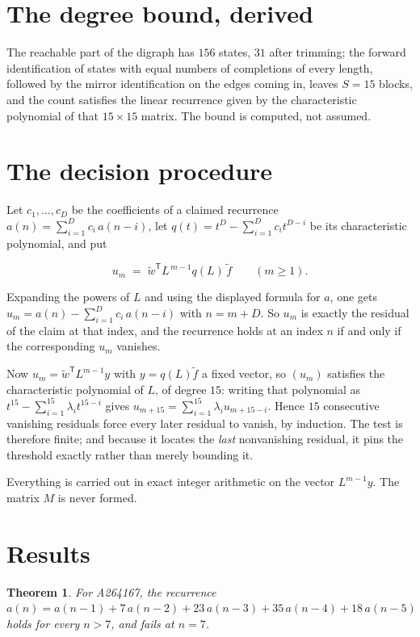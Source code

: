 \documentclass[11pt]{article}
\newtheorem{theorem}{Theorem}
\theoremstyle{definition}
\begin{document}
\section{The degree bound, derived}

The reachable part of the digraph has $156$ states, $31$ after trimming; the forward identification of states with equal numbers of completions of every length, followed by the mirror identification on the edges coming in, leaves $S = 15$ blocks, and the count satisfies the linear recurrence given by the characteristic polynomial of that $15\times15$ matrix. The bound is computed, not assumed.

\section{The decision procedure}

Let $c_1,\dots,c_D$ be the coefficients of a claimed recurrence $a(n) = \sum_{i=1}^{D} c_i\,a(n-i)$, let $q(t) = t^{D} - \sum_{i=1}^{D} c_i t^{D-i}$ be its characteristic polynomial, and put

\[u_m \;=\; \tilde w^{\mathsf T} L^{\,m-1} q(L)\,\tilde f \qquad (m \ge 1).\]

Expanding the powers of $L$ and using the displayed formula for $a$, one gets $u_m = a(n) - \sum_{i=1}^{D} c_i\,a(n-i)$ with $n = m + D$. So $u_m$ is exactly the residual of the claim at that index, and the recurrence holds at an index $n$ if and only if the corresponding $u_m$ vanishes.

Now $u_m = \tilde w^{\mathsf T} L^{m-1} y$ with $y = q(L)\tilde f$ a fixed vector, so $(u_m)$ satisfies the characteristic polynomial of $L$, of degree $15$: writing that polynomial as $t^{15} - \sum_{i=1}^{15} \lambda_i t^{15-i}$ gives $u_{m+15} = \sum_{i=1}^{15} \lambda_i u_{m+15-i}$. Hence $15$ consecutive vanishing residuals force every later residual to vanish, by induction. The test is therefore finite; and because it locates the {\itshape last} nonvanishing residual, it pins the threshold exactly rather than merely bounding it.

Everything is carried out in exact integer arithmetic on the vector $L^{m-1}y$. The matrix $M$ is never formed.

\section{Results}

\begin{theorem} For A264167, the recurrence $a(n) = a(n-1) + 7\,a(n-2) + 23\,a(n-3) + 35\,a(n-4) + 18\,a(n-5)$ holds for every $n > 7$, and fails at $n = 7$.\end{theorem}
\end{document}
